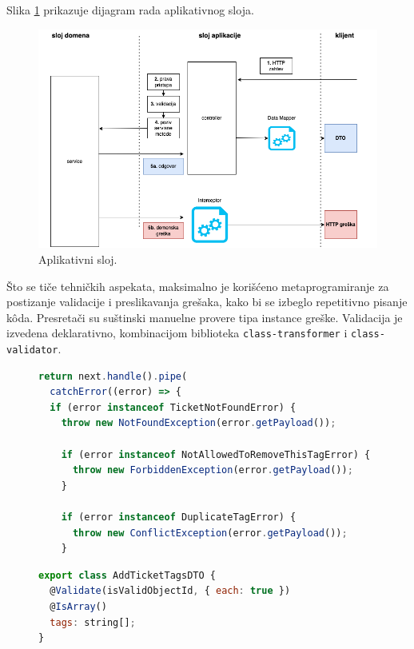 \documentclass[12pt,oneside]{memoir}
\begin{document}
Slika \ref{fig:applayerdiagram} prikazuje dijagram rada aplikativnog sloja.

\begin{figure}[h]
  \centering
  \includegraphics[width=1\textwidth]{docs/images/ch_2/applayer.png} 
  \caption{Aplikativni sloj.}
  \label{fig:applayerdiagram}
\end{figure}

Što se tiče tehničkih aspekata, maksimalno je korišćeno metaprogramiranje za postizanje validacije i preslikavanja grešaka, kako bi se izbeglo repetitivno pisanje k\^{o}da. Presretači su suštinski manuelne provere tipa instance greške. Validacija je izvedena deklarativno, kombinacijom biblioteka \verb|class-transformer| i \verb|class-validator|.

\begin{figure}[h]
\begin{lstlisting}[language=JavaScript, style=ES6, caption={Presretač grešaka.}]
return next.handle().pipe(
  catchError((error) => {
  if (error instanceof TicketNotFoundError) {
    throw new NotFoundException(error.getPayload());

    if (error instanceof NotAllowedToRemoveThisTagError) {
      throw new ForbiddenException(error.getPayload());
    }

    if (error instanceof DuplicateTagError) {
      throw new ConflictException(error.getPayload());
    }
\end{lstlisting}
\end{figure}




\begin{figure}[h]
\begin{lstlisting}[language=JavaScript, style=ES6, caption={Validacija ulaznog DTO-a.}]
export class AddTicketTagsDTO {
  @Validate(isValidObjectId, { each: true })
  @IsArray()
  tags: string[];
}
\end{lstlisting}
\end{figure}
\end{document}
